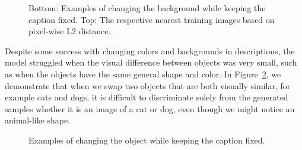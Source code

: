 \documentclass{article} %
\begin{document}
\begin{figure}[!h]
\begin{center}
%
\quad
%
\end{center}
\caption{Bottom: Examples of changing the background while keeping the caption fixed. Top: The respective nearest training images based on pixel-wise L2 distance.}
\label{fig:genimages2}
\vspace{-0.4cm}
\end{figure}

Despite some success with changing colors and backgrounds in descriptions, the model struggled when the visual difference between objects was very small, such as when the objects have the same general shape and color. In Figure~\ref{fig:genimages3}, we demonstrate that when we swap two objects that are both visually similar, for example cats and dogs, it is difficult to discriminate solely from the generated samples whether it is an image of a cat or dog, even though we might notice an animal-like shape.
 
\begin{figure}[!h]
\captionsetup[subfigure]{labelformat=empty}
\begin{center}
\quad
%
\quad
%
\quad
%
\quad
%
\end{center}
\caption{Examples of changing the object while keeping the caption fixed.}
\label{fig:genimages3}
\vspace{-0.3cm}
\end{figure}
\end{document}
